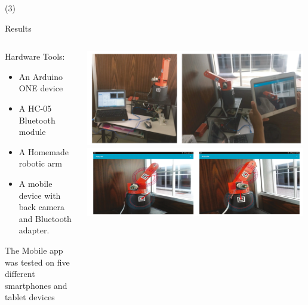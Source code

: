 \begin{frame}{ (3)}
\begin{block}{Results} 
\begin{columns}
\begin{column}{0.5\textwidth}
Hardware Tools:
\begin{itemize}
\item An Arduino ONE device
\item A HC-05 Bluetooth module
\item A Homemade robotic arm
\item A mobile device with back camera and Bluetooth
adapter.
\end{itemize}
The Mobile app was tested on five different smartphones and tablet devices
\end{column}
\begin{column}{0.5\textwidth}
\begin{center}
     \includegraphics[width=0.99\textwidth]{Figs/SistemaAR_Maestria3}
     \includegraphics[width=0.99\textwidth]{Figs/SistemaAR_Maestria4}
     \end{center}
\end{column}
\end{columns}


\end{block} 
\end{frame}

